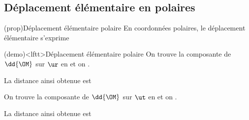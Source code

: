\documentclass[../../main/main.tex]{subfiles}
\begin{document}
\subsection{Déplacement élémentaire en polaires}
\begin{tcb*}(prop){Déplacement élémentaire polaire}
	En coordonnées polaires, le déplacement élémentaire s'exprime
	\psw{\[\boxed{\dd\OM = \dd r\ur + r(t)\dd\th\ut}\]}
	\vspace{-15pt}
\end{tcb*}


\begin{tcb}[sidebyside, righthand ratio=.40](demo)<lftt>{Déplacement élémentaire polaire}
	On trouve la composante de $\dd{\OM}$ sur $\ur$ en  et on
	.
	\begin{center}
		La distance ainsi obtenue est 
	\end{center}
	\bigbreak
	On trouve la composante de $\dd{\OM}$ sur $\ut$ en  et on
	.
	\begin{center}
		La distance ainsi obtenue est 
	\end{center}
	\tcblower
	\begin{center}
		\vspace{-15pt}
	\end{center}
\end{tcb}
\end{document}
